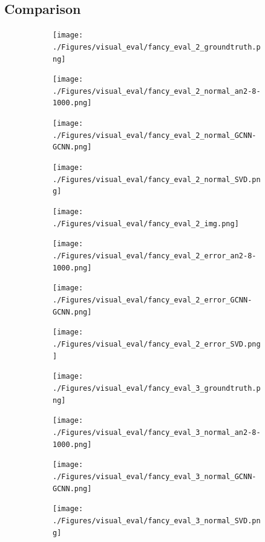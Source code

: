 \documentclass[border=15pt, multi, tikz]{article}
\begin{document}
\subsection{Comparison}

\newpage
\begin{figure}[H]
	\centering
	\begin{subfigure}[b]{0.24\linewidth}
		\texttt{[image: ./Figures/visual\_eval/fancy\_eval\_2\_groundtruth.png]}
	\end{subfigure}
	\begin{subfigure}[b]{0.24\linewidth}
		\texttt{[image: ./Figures/visual\_eval/fancy\_eval\_2\_normal\_an2-8-1000.png]}
	\end{subfigure}
	\begin{subfigure}[b]{0.24\linewidth}
		\texttt{[image: ./Figures/visual\_eval/fancy\_eval\_2\_normal\_GCNN-GCNN.png]}
	\end{subfigure}
	\begin{subfigure}[b]{0.24\linewidth}
	\texttt{[image: ./Figures/visual\_eval/fancy\_eval\_2\_normal\_SVD.png]}
	\end{subfigure}

	\begin{subfigure}[b]{0.24\linewidth}
	\texttt{[image: ./Figures/visual\_eval/fancy\_eval\_2\_img.png]}
\end{subfigure}
\begin{subfigure}[b]{0.24\linewidth}
	\texttt{[image: ./Figures/visual\_eval/fancy\_eval\_2\_error\_an2-8-1000.png]}
\end{subfigure}
\begin{subfigure}[b]{0.24\linewidth}
	\texttt{[image: ./Figures/visual\_eval/fancy\_eval\_2\_error\_GCNN-GCNN.png]}
\end{subfigure}
\begin{subfigure}[b]{0.24\linewidth}
	\texttt{[image: ./Figures/visual\_eval/fancy\_eval\_2\_error\_SVD.png]}
\end{subfigure}

	\begin{subfigure}[b]{0.24\linewidth}
	\texttt{[image: ./Figures/visual\_eval/fancy\_eval\_3\_groundtruth.png]}
\end{subfigure}
\begin{subfigure}[b]{0.24\linewidth}
	\texttt{[image: ./Figures/visual\_eval/fancy\_eval\_3\_normal\_an2-8-1000.png]}
\end{subfigure}
\begin{subfigure}[b]{0.24\linewidth}
	\texttt{[image: ./Figures/visual\_eval/fancy\_eval\_3\_normal\_GCNN-GCNN.png]}
\end{subfigure}
\begin{subfigure}[b]{0.24\linewidth}
	\texttt{[image: ./Figures/visual\_eval/fancy\_eval\_3\_normal\_SVD.png]}
\end{subfigure}




\end{figure}
\end{document}
